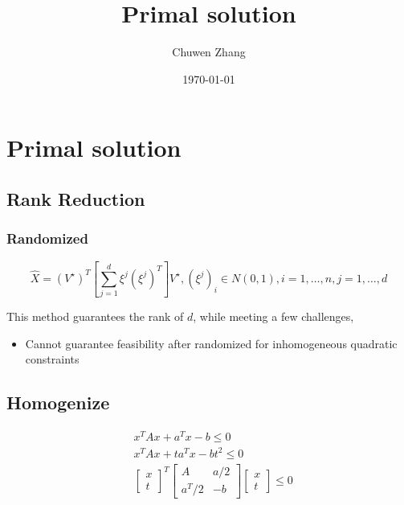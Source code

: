 \documentclass[../main]{subfiles}
\title{Primal solution}
\author{Chuwen Zhang}
\date{\today}
\begin{document}
\maketitle
{
    \setcounter{tocdepth}{3}
    \tableofcontents
}
\section{Primal solution}

\subsection{Rank Reduction}
\subsubsection{Randomized}

\begin{equation}
    \hat{X}=(V^\star)^T\left[\sum_{j=1}^d \xi^j(\xi^j)^T\right] V^\star,
    (\xi^j)_i \in N(0, 1), i = 1,\dots,n, j = 1, \dots, d
\end{equation}

This method guarantees the rank of \(d\), while meeting a few challenges,

\begin{itemize}
    \item Cannot guarantee feasibility after randomized for inhomogeneous quadratic constraints
\end{itemize}

\subsection{Homogenize}


\begin{align*}
     & x^TAx + a^Tx  - b \le 0      \\
     & x^TAx + ta^Tx  - bt^2 \le 0  \\
     & \begin{bmatrix} x \\ t \end{bmatrix}^T
    \begin{bmatrix} A & a/2 \\ a^T/2 & -b \end{bmatrix}
    \begin{bmatrix} x \\ t \end{bmatrix} \le 0 \\
\end{align*}
\end{document}
